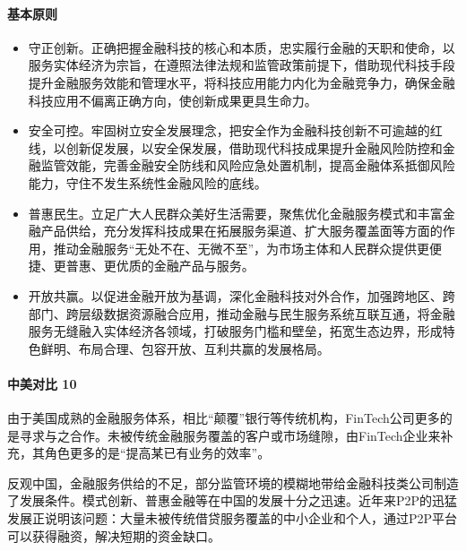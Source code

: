 \documentclass[letterpaper,10pt,english]{sphinxmanual}
\begin{document}
\paragraph{基本原则}
\label{\detokenize{chapter_AI+Finance/FinTech:id15}}\begin{itemize}
\item {} 
守正创新。正确把握金融科技的核心和本质，忠实履行金融的天职和使命，以服务实体经济为宗旨，在遵照法律法规和监管政策前提下，借助现代科技手段提升金融服务效能和管理水平，将科技应用能力内化为金融竞争力，确保金融科技应用不偏离正确方向，使创新成果更具生命力。

\item {} 
安全可控。牢固树立安全发展理念，把安全作为金融科技创新不可逾越的红线，以创新促发展，以安全保发展，借助现代科技成果提升金融风险防控和金融监管效能，完善金融安全防线和风险应急处置机制，提高金融体系抵御风险能力，守住不发生系统性金融风险的底线。

\item {} 
普惠民生。立足广大人民群众美好生活需要，聚焦优化金融服务模式和丰富金融产品供给，充分发挥科技成果在拓展服务渠道、扩大服务覆盖面等方面的作用，推动金融服务“无处不在、无微不至”，为市场主体和人民群众提供更便捷、更普惠、更优质的金融产品与服务。

\item {} 
开放共赢。以促进金融开放为基调，深化金融科技对外合作，加强跨地区、跨部门、跨层级数据资源融合应用，推动金融与民生服务系统互联互通，将金融服务无缝融入实体经济各领域，打破服务门槛和壁垒，拓宽生态边界，形成特色鲜明、布局合理、包容开放、互利共赢的发展格局。

\end{itemize}


\paragraph{中美对比 10\sphinxfootnotemark[1102]}
\label{\detokenize{chapter_AI+Finance/FinTech:id16}}%
\begin{footnotetext}[1102]\sphinxAtStartFootnote
{}
%
\end{footnotetext}\ignorespaces 
{}

由于美国成熟的金融服务体系，相比“颠覆”银行等传统机构，FinTech公司更多的是寻求与之合作。未被传统金融服务覆盖的客户或市场缝隙，由FinTech企业来补充，其角色更多的是“提高某已有业务的效率”。

反观中国，金融服务供给的不足，部分监管环境的模糊地带给金融科技类公司制造了发展条件。模式创新、普惠金融等在中国的发展十分之迅速。近年来P2P的迅猛发展正说明该问题：大量未被传统借贷服务覆盖的中小企业和个人，通过P2P平台可以获得融资，解决短期的资金缺口。
\end{document}

